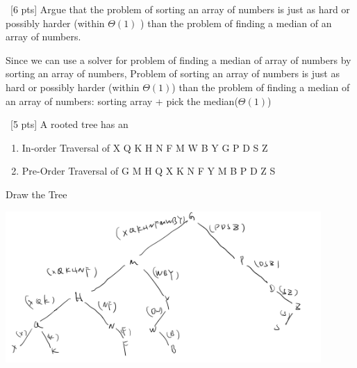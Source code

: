 \documentclass[12pt]{article}
\newenvironment{sol}[1][Solution]{\begin{trivlist}\item[\hskip\labelsep {\bfseries #1:}]}{\end{trivlist}}
\begin{document}
\begin{enumerate}
    \item \ [6 pts] Argue that the problem of sorting an array of numbers is just as hard or possibly harder (within $\Theta(1)$ ) than the problem of finding a median of an array of numbers.
    \begin{sol}
        Since we can use a solver for problem of finding a median of array of numbers by sorting an array of numbers, Problem of sorting an array of numbers is just as hard or possibly harder (within $\Theta(1)$) than the problem of finding a median of an array of numbers: sorting array + pick the median($\Theta(1)$)
    \end{sol}

    \item \ [5 pts] A rooted tree has an
    \begin{enumerate}
        \item In-order Traversal of X Q K H N F M W B Y G P D S Z
        \item Pre-Order Traversal of G M H Q X K N F Y M B P D Z S
    \end{enumerate}
Draw the Tree
        \begin{center}
    \includegraphics[width=0.9\textwidth]{p4.jpeg}
    \end{center} 


\end{enumerate}
\end{document}
